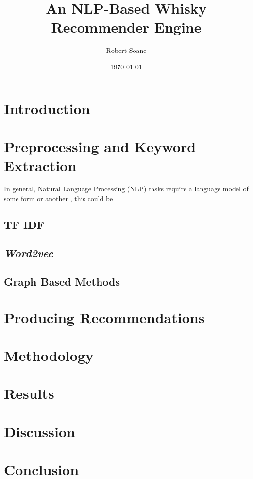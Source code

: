 \documentclass[12pt, a4paper, oneside, notitlepage]{article}
\title{An NLP-Based Whisky Recommender Engine}
\author{Robert Soane}
\date{\today}
\begin{document}
\maketitle

\section{Introduction}\label{sec:intro}
\section{Preprocessing and Keyword Extraction}\label{sec:kwe}
In general, Natural Language Processing (NLP) tasks require a language model of some form or another \cite{Ranjan2016},
this could be 
\subsection{TF IDF}\label{ssec:tfidf}
\subsection{\emph{Word2vec}}
\subsection{Graph Based Methods}
\section{Producing Recommendations}\label{sec:recommendations}
 
\section{Methodology}\label{sec:meth}
\section{Results}\label{sec:res}
\section{Discussion}\label{sec:disc}
\section{Conclusion}\label{sec:conc}


\end{document}
